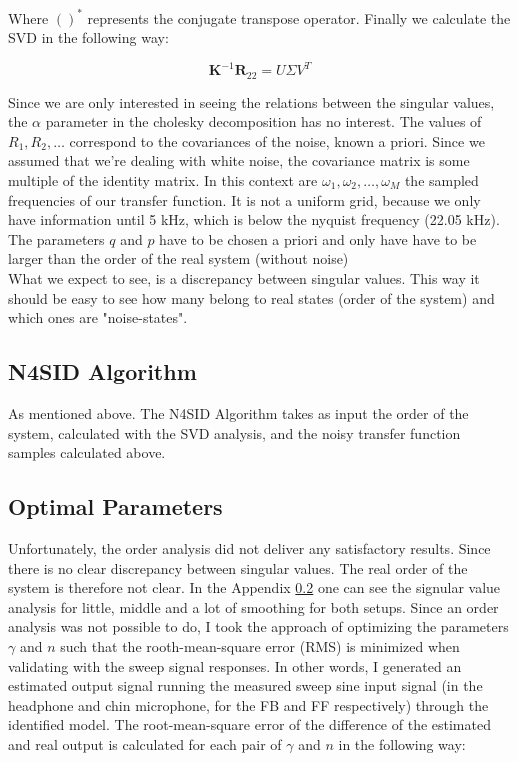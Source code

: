 Where $()^*$ represents the conjugate transpose operator. Finally we calculate the SVD in the following way:

\[\textbf{K}^{-1}\textbf{R}_{22} = U\Sigma V^T\]

Since we are only interested in seeing the relations between the singular values, the $\alpha$ parameter in the cholesky decomposition has no interest. The values of $R_1, R_2, \dots$ correspond to the covariances of the noise, known a priori. Since we assumed that we're dealing with white noise, the covariance matrix is some multiple of the identity matrix. In this context are $\omega_1, \omega_2,\dots,\omega_M$ the sampled frequencies of our transfer function. It is not a uniform grid, because we only have information until 5 kHz, which is below the nyquist frequency (22.05 kHz). The parameters $q$ and $p$ have to be chosen a priori and only have have to be larger than the order of the real system (without noise)\\

What we expect to see, is a discrepancy between singular values. This way it should be easy to see how many belong to real states (order of the system) and which ones are "noise-states".

\subsection{N4SID Algorithm}

As mentioned above. The N4SID Algorithm takes as input the order of the system, calculated with the SVD analysis, and the noisy transfer function samples calculated above. 

\subsection{Optimal Parameters}

Unfortunately, the order analysis did not deliver any satisfactory results. Since there is no clear discrepancy between singular values. The real order of the system is therefore not clear. In the Appendix \ref{} one can see the signular value analysis for little, middle and a lot of smoothing for both setups. Since an order analysis was not possible to do, I took the approach of optimizing the parameters $\gamma$ and $n$ such that the rooth-mean-square error (RMS) is minimized when validating with the sweep signal responses. In other words, I generated an estimated output signal running the measured sweep sine input signal (in the headphone and chin microphone, for the FB and FF respectively) through the identified model. The root-mean-square error of the difference of the estimated and real output is calculated for each pair of $\gamma$ and $n$ in the following way:

